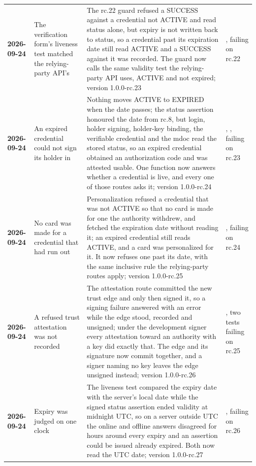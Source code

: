 {\begin{xltabular}{\textwidth}{>{\bfseries\hspace{0pt}}p{0.62in} >{\RaggedRight\arraybackslash\hspace{0pt}}X >{\RaggedRight\arraybackslash\hspace{0pt}}X >{\RaggedRight\arraybackslash\hspace{0pt}}p{1.6in}}
2026-09-24 & The verification form's liveness test matched the relying-party API's & The rc.22 guard refused a SUCCESS against a credential not ACTIVE and read status alone, but expiry is not written back to status, so a credential past its expiration date still read ACTIVE and a SUCCESS against it was recorded. The guard now calls the same validity test the relying-party API uses, ACTIVE and not expired; version 1.0.0-rc.23 & , failing on rc.22 \\
2026-09-24 & An expired credential could not sign its holder in & Nothing moves ACTIVE to EXPIRED when the date passes; the status assertion honoured the date from rc.8, but login, holder signing, holder-key binding, the verifiable credential and the mdoc read the stored status, so an expired credential obtained an authorization code and was attested usable. One function now answers whether a credential is live, and every one of those routes asks it; version 1.0.0-rc.24 & , , failing on rc.23 \\
2026-09-24 & No card was made for a credential that had run out & Personalization refused a credential that was not ACTIVE so that no card is made for one the authority withdrew, and fetched the expiration date without reading it; an expired credential still reads ACTIVE, and a card was personalized for it. It now refuses one past its date, with the same inclusive rule the relying-party routes apply; version 1.0.0-rc.25 & , failing on rc.24 \\
2026-09-24 & A refused trust attestation was not recorded & The attestation route committed the new trust edge and only then signed it, so a signing failure answered with an error while the edge stood, recorded and unsigned; under the development signer every attestation toward an authority with a key did exactly that. The edge and its signature now commit together, and a signer naming no key leaves the edge unsigned instead; version 1.0.0-rc.26 & , two tests failing on rc.25 \\
2026-09-24 & Expiry was judged on one clock & The liveness test compared the expiry date with the server's local date while the signed status assertion ended validity at midnight UTC, so on a server outside UTC the online and offline answers disagreed for hours around every expiry and an assertion could be issued already expired. Both now read the UTC date; version 1.0.0-rc.27 & , failing on rc.26 \\

\end{xltabular}}
